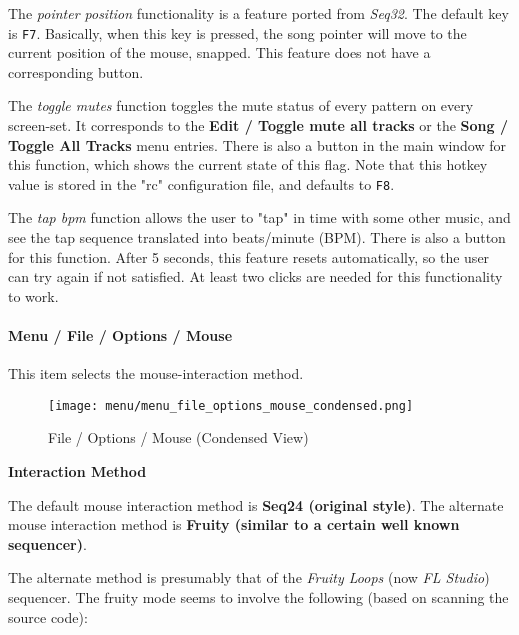    The \textsl{pointer position} functionality is a feature ported
   from \textsl{Seq32}.
   The default key is \texttt{F7}.
   Basically, when this key is pressed, the song pointer will move to the
   current position of the mouse, snapped.
   This feature does not have a corresponding button.

   The \textsl{toggle mutes} function toggles the mute status of every
   pattern on every screen-set.  It corresponds to the
   \textbf{Edit / Toggle mute all tracks} or the 
   \textbf{Song / Toggle All Tracks}
   menu entries.  There is also a button in the main window for this function,
   which shows the current state of this flag.  Note that this
   hotkey value is stored in the "rc" configuration file, and
   defaults to \texttt{F8}.

   The \textsl{tap bpm} function allows the user to "tap" in time with some
   other music, and see the tap sequence translated into beats/minute (BPM).
   There is also a button for this function.
   After 5 seconds, this feature resets automatically, so the user can try
   again if not satisfied.  At least two clicks are needed for this
   functionality to work.

%

\paragraph{Menu / File / Options / Mouse }
\label{paragraph:seq64_menu_file_options_mouse}

   This item selects the mouse-interaction method.

\begin{figure}[H]
   \centering 
   \texttt{[image: menu/menu\_file\_options\_mouse\_condensed.png]}
   \caption{File / Options / Mouse (Condensed View)}
   \label{fig:seq64_menu_file_options_mouse}
\end{figure}

   \textbf{Interaction Method}

   The default mouse interaction method is \textbf{Seq24 (original style)}.
   The alternate mouse interaction method is \textbf{Fruity (similar to a
   certain well known sequencer)}.

   The alternate method is presumably that of the \textsl{Fruity Loops}
   (now \textsl{FL Studio}) sequencer.  The fruity mode seems to involve the
   following (based on scanning the source code):

